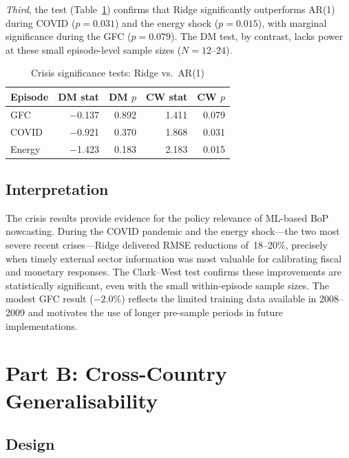 \emph{Third}, the \citet{clark2007approximately} test (Table~\ref{tab:ch3_crisis_cw}) confirms that Ridge significantly outperforms AR(1) during COVID ($p = 0.031$) and the energy shock ($p = 0.015$), with marginal significance during the GFC ($p = 0.079$).  The DM test, by contrast, lacks power at these small episode-level sample sizes ($N = 12$--$24$).

\begin{table}[htbp]
\centering
\caption{Crisis significance tests: Ridge vs.\ AR(1)}
\label{tab:ch3_crisis_cw}
\begin{tabular}{@{} l r r r r @{}}
\toprule
{Episode} & {DM stat} & {DM $p$} & {CW stat} & {CW $p$} \\
\midrule
GFC    & $-$0.137 & 0.892 & 1.411 & 0.079 \\
COVID  & $-$0.921 & 0.370 & 1.868 & 0.031 \\
Energy & $-$1.423 & 0.183 & 2.183 & 0.015 \\
\bottomrule
\end{tabular}
\end{table}

\subsection{Interpretation}

The crisis results provide evidence for the policy relevance of ML-based BoP nowcasting.  During the COVID pandemic and the energy shock---the two most severe recent crises---Ridge delivered RMSE reductions of~18--20\%, precisely when timely external sector information was most valuable for calibrating fiscal and monetary responses.  The Clark--West test confirms these improvements are statistically significant, even with the small within-episode sample sizes.  The modest GFC result ($-2.0\%$) reflects the limited training data available in 2008--2009 and motivates the use of longer pre-sample periods in future implementations.


\section{Part B: Cross-Country Generalisability}
\label{sec:ch3_crosscountry}

\subsection{Design}

